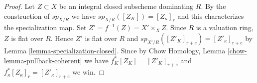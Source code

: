 \documentclass{stacks-project}
\theoremstyle{plain}
\theoremstyle{definition}
\theoremstyle{remark}
\numberwithin{equation}{subsection}
\begin{document}
\begin{proof}
Let $Z \subset X$ be an integral closed subscheme dominating $R$.
By the construction of $sp_{X/R}$ we have $sp_{X/R}([Z_K]) = [Z_\kappa]_r$
and this characterizes the specialization map.
Set $Z' = f^{-1}(Z) = X' \times_X Z$.
Since $R$ is a valuation ring, $Z$ is flat over $R$.
Hence $Z'$ is flat over $R$ and
$sp_{X'/R}([Z'_K]_{r + e}) = [Z'_\kappa]_{r + e}$
by Lemma \ref{lemma-specialization-closed}.
Since by Chow Homology, Lemma \ref{chow-lemma-pullback-coherent}
we have $f_K^*[Z_K] = [Z'_K]_{r + e}$ and
$f_\kappa^*[Z_\kappa]_r = [Z'_\kappa]_{r + e}$ we win.
\end{proof}
\end{document}
